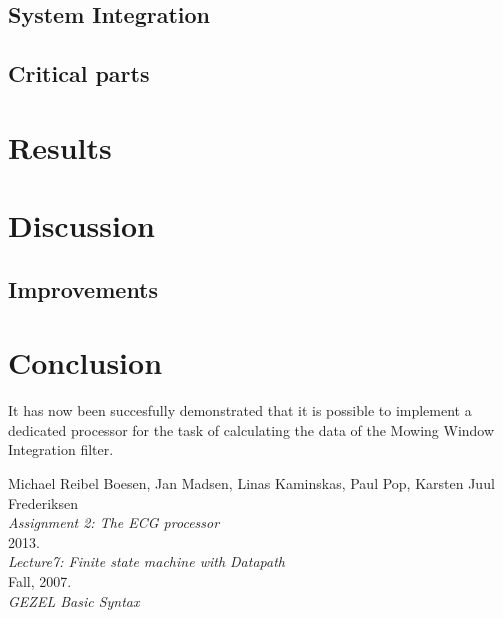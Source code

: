 \documentclass[12pt,a4paper]{article}
\begin{document}
\subsection{System Integration}
	
\subsection{Critical parts}

\section{Results}
	

\section{Discussion}
	
\subsection{Improvements}

\section{Conclusion}
It has now been succesfully demonstrated that it is possible to implement a dedicated processor for the task of calculating the data of the Mowing Window Integration filter.
\newpage
\begin{thebibliography}{9}

  Michael Reibel Boesen, Jan Madsen, Linas Kaminskas, Paul Pop, Karsten Juul Frederiksen\\
  \emph{Assignment 2: The ECG processor}\\
  2013.\\

  \emph{Lecture7: Finite state machine with Datapath}\\
  Fall, 2007.\\

  \emph{GEZEL Basic Syntax}\\
\end{thebibliography}
	
\end{document}
